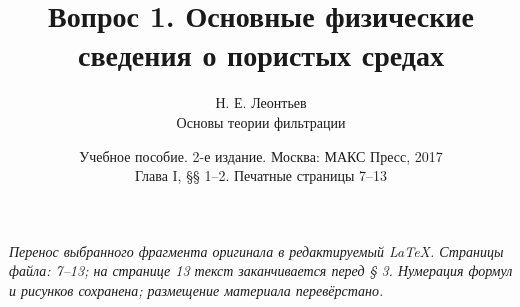 \documentclass[12pt,a4paper]{article}
\title{Вопрос 1. Основные физические сведения о пористых средах}
\author{Н. Е. Леонтьев\\\large Основы теории фильтрации}
\date{Учебное пособие. 2-е издание. Москва: МАКС Пресс, 2017\\Глава I, §§ 1--2. Печатные страницы 7--13}
\begin{document}
\maketitle
\noindent\textit{Перенос выбранного фрагмента оригинала в редактируемый LaTeX. Страницы файла: 7--13; на странице 13 текст заканчивается перед § 3. Нумерация формул и рисунков сохранена; размещение материала перевёрстано.}

\end{document}
